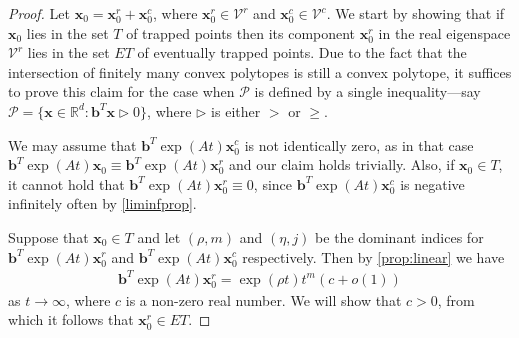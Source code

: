 \begin{proof}

  Let
  $\boldsymbol{x}_{0}=\boldsymbol{x}_{0}^{r}+\boldsymbol{x}_{0}^{c}$,
  where $\boldsymbol{x}_{0}^{r}\in \mathcal{V}^{r}$ and
  $\boldsymbol{x}_{0}^{c}\in \mathcal{V}^{c}$. We start by showing
  that if $\boldsymbol{x}_{0}$ lies in the set $T$ of trapped points
  then its component $\boldsymbol{x}_{0}^{r}$ in the real eigenspace
  $\mathcal{V}^{r}$ lies in the set $\mathit{ET}$ of eventually
  trapped points.
Due to the
fact that the intersection of finitely many convex polytopes is still
a convex polytope, it suffices to prove this claim for the case when
  $\mathcal{P}$ is defined by a single inequality---say
  $\mathcal{P}=\lbrace \boldsymbol{x}\in\mathbb{R}^{d}:
  \boldsymbol{b}^{T}\boldsymbol{x}\triangleright 0\rbrace$, where
  $\triangleright$ is either $>$ or $\geq$.

  We may assume that
  $\boldsymbol{b}^{T} \exp(At) \boldsymbol{x}_{0}^{c}$ is not identically
  zero, as in that case
  $\boldsymbol{b}^{T} \exp(At)\boldsymbol{x}_{0} \equiv
  \boldsymbol{b}^{T} \exp(At)\boldsymbol{x}_{0}^{r}$ and our claim
  holds trivially.
  Also, if $\boldsymbol{x}_{0}\in\mathit{T}$, it cannot hold that
  $\boldsymbol{b}^{T} \exp(At) \boldsymbol{x}_{0}^{r} \equiv 0$, since
  $\boldsymbol{b}^{T} \exp(At) \boldsymbol{x}_{0}^{c}$ is negative
  infinitely often by \cref{liminfprop}.

  Suppose that $\boldsymbol{x}_{0}\in\mathit{T}$ and let $(\rho,m)$
  and $(\eta,j)$ be the dominant indices for
  $\boldsymbol{b}^{T} \exp(At) \boldsymbol{x}_{0}^{r}$ and
  $\boldsymbol{b}^{T} \exp(At) \boldsymbol{x}_{0}^{c}$ respectively.
Then by \cref{prop:linear} we have
\begin{gather}
\boldsymbol{b}^{T} \exp(At) \boldsymbol{x}_{0}^{r} = \exp(\rho t)t^m (c
  + o(1))
\label{eq:real}
\end{gather}
 as $t \rightarrow \infty$, where $c$ is a non-zero real
number.  We will show that $c>0$, from which it follows  that
$\boldsymbol{x}_{0}^{r} \in \mathit{ET}$.


\end{proof}
